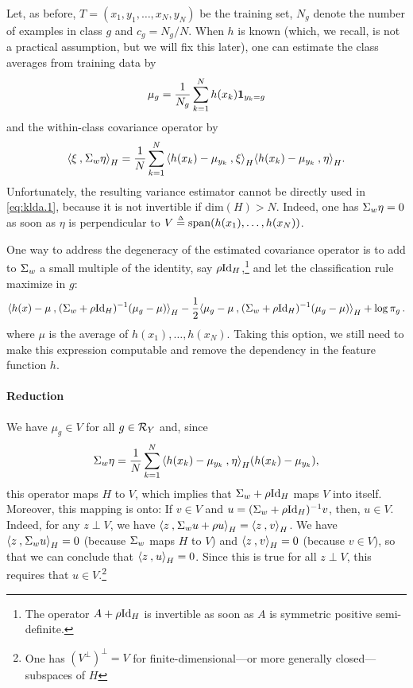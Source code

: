 Let, as before, $T = (x_1, y_1, \ldots, x_N, y_N)$ be the training set,  $N_g$ denote the number of examples in class $g$ and $c_g = N_g/N$.
When $h$ is known (which, we recall, is not a practical assumption, but we will fix this later), one can estimate the class averages from training data by
\[
\mu_g = \frac1{N_g}\sum_{k=1}^N h(x_k) {\bm 1}_{y_k=g}
\]
and the within-class covariance operator by
\[
{\langle {\xi}\mathbin{,} {\Sigma_w\eta}\rangle}_H = \frac1N \sum_{k=1}^N {\langle {h(x_k) - \mu_{y_k}}\mathbin{,} {\xi}\rangle}_H {\langle {h(x_k) - \mu_{y_k}}\mathbin{,} {\eta}\rangle}_H.
\]
Unfortunately, the  resulting variance estimator cannot be directly used in \cref{eq:klda.1}, because it is not invertible if $\mathrm{dim}(H) > N$. Indeed, one has $\Sigma_w\eta = 0$ as soon as $\eta$ is perpendicular to $V \stackrel{{\scriptscriptstyle \Delta}}{=} \mathrm{span}(h(x_1), \ldots, h(x_N))$. 

One way to address the degeneracy of the estimated covariance operator is to add to $\Sigma_w$ a small multiple of the identity, say $\rho\Id_H$,\footnote{The operator $A + \rho\Id_H$ is invertible as soon as $A$ is symmetric positive semi-definite.} and let the classification rule maximize in $g$:
\begin{multline}
\label{eq:klda.3}
\scp{h(x)-\mu}{ (\Sig_w + \rho\Id_H)^{-1} (\mu_g -  \mu)}_H 
- \frac12 \scp{\mu_g -  \mu}{(\Sig_w + \rho\Id_H)^{-1} (\mu_g-  \mu)}_H + \log\pi_g\,.
\end{multline}
where $\mu$ is the average of $h(x_1), \ldots, h(x_N)$. 
Taking this option, 
we still need to make this expression computable and remove the dependency in the feature function $h$.


\paragraph{Reduction}
We have $\mu_g\in V$ for all $g\in{\mathcal R}_Y$ and, since 
\[
\Sigma_w\eta = \frac1N \sum_{k=1}^N  {\langle {h(x_k) - \mu_{y_k}}\mathbin{,} {\eta}\rangle}_H (h(x_k) - \mu_{y_k}),
\]
this operator maps $H$ to $V$, which implies that $\Sig_w + \rho \Id_H$ maps $V$ into itself. 
Moreover,  this mapping is onto: If $v\in V$ and $u = (\Sig_w +\rho \Id_H)^{-1}v$, then, $u\in V$.
Indeed, for any $z\perp V$, we have ${\langle {z}\mathbin{,} {\Sigma_w u + \rho u}\rangle}_H = {\langle {z}\mathbin{,} {v}\rangle}_H$. We have  ${\langle {z}\mathbin{,} {\Sigma_w u}\rangle}_H = 0$ (because $\Sigma_w$ maps $H$ to $V$) and ${\langle {z}\mathbin{,} {v}\rangle}_H = 0$  (because $v\in V$), so that we can conclude that  ${\langle {z}\mathbin{,} {u}\rangle}_H = 0$. 
 Since this is true for all $z\perp V$, this requires that $u\in V$.\footnote{One has $(V^\perp)^\perp = V$ for finite-dimensional---or more generally closed---subspaces of $H$}

